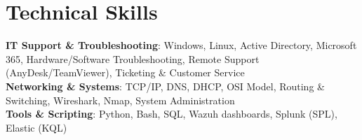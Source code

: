 \documentclass[a4paper,11pt]{article}
\begin{document}
\section{Technical Skills}
  \begin{itemize}[leftmargin=0.5cm, label={}]
     \small{\item{
      \textbf{IT Support \& Troubleshooting}{: Windows, Linux, Active Directory, Microsoft 365, Hardware/Software Troubleshooting, Remote Support (AnyDesk/TeamViewer), Ticketing \& Customer Service} \\
      \textbf{Networking \& Systems}{: TCP/IP, DNS, DHCP, OSI Model, Routing \& Switching, Wireshark, Nmap, System Administration} \\
      \textbf{Tools \& Scripting}{: Python, Bash, SQL, Wazuh dashboards, Splunk (SPL), Elastic (KQL)} \\
     }}
  \end{itemize}

\end{document}
